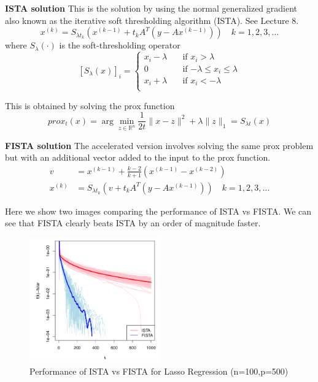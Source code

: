 \documentclass[twoside]{article}
\begin{document}
{\bf ISTA solution}
This is the solution by using the normal generalized gradient also known as the iterative soft thresholding algorithm (ISTA). See Lecture 8. 
\[
	x^{(k)} = S_{\lambda t_k}(x^{(k-1)}+t_kA^T(y-Ax^{(k-1)})) \quad k=1,2,3,\dotsc
\]
where $S_{\lambda}(\cdot)$ is the soft-thresholding operator
\[ \left[ S_{\lambda}(x)\right]_i = 
\begin{cases}
x_i - \lambda & \quad \text{if $x_i > \lambda$} \\
0 & \quad \text{if $-\lambda \leq x_i \leq \lambda$} \\
x_i + \lambda & \quad \text{if $x_i < -\lambda$} \\
\end{cases}
\]

This is obtained by solving the prox function
\[
	prox_t(x) = \operatorname{arg}\min_{z\in \mathbb{R}^n}\frac{1}{2t}\lVert x-z \rVert^2 + \lambda\lVert z \rVert_1  = S_{\lambda t}(x)
\]

{\bf FISTA solution}
The accelerated version involves solving the same prox problem but with an additional vector added to the input to the prox function.
\begin{align*}
v &= x^{(k-1)} + \frac{k-2}{k+1}(x^{(k-1)}-x^{(k-2)}) \\
x^{(k)} &= S_{\lambda t_k}(v+t_kA^T(y-Ax^{(k-1)})) \quad k=1,2,3,\dotsc
\end{align*}

Here we show two images comparing the performance of ISTA vs FISTA. We can see that FISTA clearly beats ISTA by an order of magnitude faster. 

\begin{figure}[ht]
\centering
\includegraphics[width=0.5\textwidth]{scribe1.png}
\caption{Performance of ISTA vs FISTA for Lasso Regression (n=100,p=500)}
\end{figure}
\end{document}
